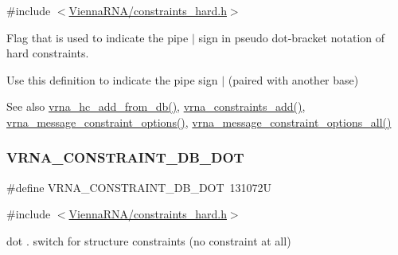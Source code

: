 {\ttfamily \#include $<$\mbox{\hyperlink{constraints__hard_8h}{Vienna\+R\+N\+A/constraints\+\_\+hard.\+h}}$>$}



Flag that is used to indicate the pipe \textquotesingle{}$\vert$\textquotesingle{} sign in pseudo dot-\/bracket notation of hard constraints. 

Use this definition to indicate the pipe sign \textquotesingle{}$\vert$\textquotesingle{} (paired with another base)

\begin{DoxySeeAlso}{See also}
\mbox{\hyperlink{group__hard__constraints_ga5b4de3247b67358080c176b94591a8e6}{vrna\+\_\+hc\+\_\+add\+\_\+from\+\_\+db()}}, \mbox{\hyperlink{group__constraints_ga35a401f680969a556858a8dd5f1d07cc}{vrna\+\_\+constraints\+\_\+add()}}, \mbox{\hyperlink{group__constraints_gaa1f20b53bf09ac2e6b0dbb13f7d89670}{vrna\+\_\+message\+\_\+constraint\+\_\+options()}}, \mbox{\hyperlink{group__constraints_gaec7e13fa0465c2acc7a621d1aecb709f}{vrna\+\_\+message\+\_\+constraint\+\_\+options\+\_\+all()}} 
\end{DoxySeeAlso}
\mbox{\label{group__hard__constraints_ga369bea82eae75fbe626f409fa425747e}} 
\subsubsection{\texorpdfstring{V\+R\+N\+A\+\_\+\+C\+O\+N\+S\+T\+R\+A\+I\+N\+T\+\_\+\+D\+B\+\_\+\+D\+OT}{VRNA\_CONSTRAINT\_DB\_DOT}}
{\footnotesize\ttfamily \#define V\+R\+N\+A\+\_\+\+C\+O\+N\+S\+T\+R\+A\+I\+N\+T\+\_\+\+D\+B\+\_\+\+D\+OT~131072U}



{\ttfamily \#include $<$\mbox{\hyperlink{constraints__hard_8h}{Vienna\+R\+N\+A/constraints\+\_\+hard.\+h}}$>$}



dot \textquotesingle{}.\textquotesingle{} switch for structure constraints (no constraint at all) 

